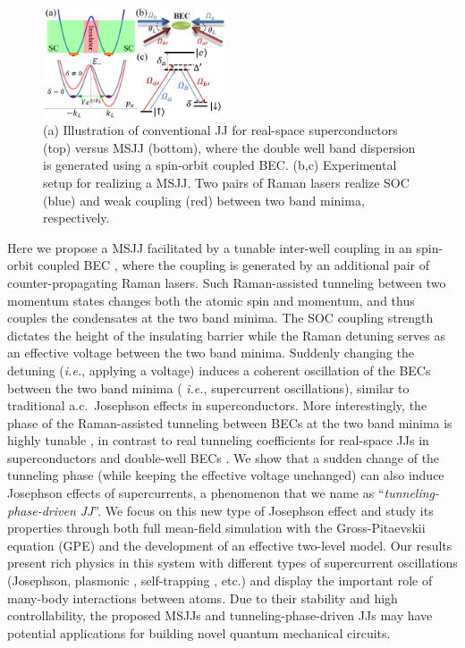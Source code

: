 \documentclass[twocolumn,prl,floatfix,citeautoscript,nofootinbib,superscriptaddress]{revtex4}
\begin{document}
\begin{figure}[t]
\centering
\includegraphics[width=0.48\textwidth]{Fig1.PNG}
\caption{(a) Illustration of conventional JJ for real-space superconductors
(top) versus MSJJ (bottom), where the double well band dispersion is
generated using a spin-orbit coupled BEC. (b,c) Experimental setup for
realizing a MSJJ. Two pairs of Raman lasers realize SOC (blue) and weak
coupling (red) between two band minima, respectively.}
\label{fig1}
\end{figure}

Here we propose a MSJJ facilitated by a tunable inter-well coupling in an
spin-orbit coupled BEC \cite{Galitski-review,Zhang2016}, where the coupling
is generated by an additional pair of counter-propagating Raman lasers. Such
Raman-assisted tunneling between two momentum states changes both the atomic
spin and momentum, and thus couples the condensates at the two band minima.
The SOC coupling strength dictates the height of the insulating barrier
while the Raman detuning serves as an effective voltage between the two band
minima. Suddenly changing the detuning (\textit{i.e.}, applying a voltage)
induces a coherent oscillation of the BECs between the two band minima (%
\textit{i.e.}, supercurrent oscillations), similar to traditional
a.c.~Josephson effects in superconductors. More interestingly, the phase of
the Raman-assisted tunneling between BECs at the two band minima is highly
tunable \cite{Spielman2015}, in contrast to real tunneling coefficients for
real-space JJs in superconductors \cite{Giaever1960,Likharev1979} and
double-well BECs \cite{Albiez2005,Levy2007}. We show that a sudden change of
the tunneling phase (while keeping the effective voltage unchanged) can also
induce Josephson effects of supercurrents, a phenomenon that we name as
\textquotedblleft \textit{tunneling-phase-driven JJ}\textquotedblright . We
focus on this new type of Josephson effect and study its properties through
both full mean-field simulation with the Gross-Pitaevskii equation (GPE)
\cite{Dalfovo1999,BEC-book} and the development of an effective two-level
model. Our results present rich physics in this system with different types
of supercurrent oscillations (Josephson, plasmonic \cite{Raghavan1999},
self-trapping \cite{Raghavan1999,Albiez2005}, etc.) and display the
important role of many-body interactions between atoms. Due to their
stability and high controllability, the proposed MSJJs and
tunneling-phase-driven JJs may have potential applications for building
novel quantum mechanical circuits.
\end{document}
